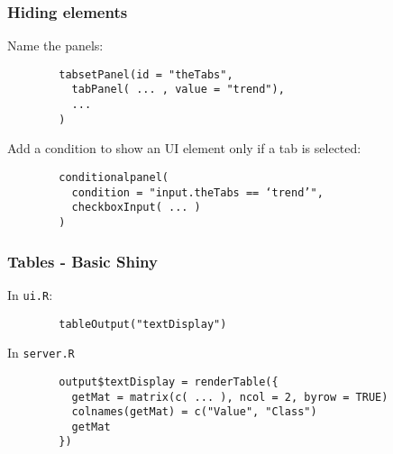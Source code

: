 \documentclass{beamer}
\begin{document}
	\begin{frame}[fragile]
		\frametitle{Hiding elements}
		
		Name the panels:
		\begin{exampleblock}{}
		\begin{BVerbatim}
		tabsetPanel(id = "theTabs",
		  tabPanel( ... , value = "trend"),
		  ...
		)
		\end{BVerbatim}
		\end{exampleblock}{}

		\vspace{1em}

		Add a condition to show an UI element only if a tab is selected:
		\begin{exampleblock}{}
		\begin{BVerbatim}
		conditionalpanel(
		  condition = "input.theTabs == ‘trend’",
		  checkboxInput( ... )
		)
		\end{BVerbatim}
		\end{exampleblock}{}

	\end{frame}

	\begin{frame}[fragile]
		\frametitle{Tables - Basic Shiny}
		
		In \verb|ui.R|:
		\begin{exampleblock}{}
		\begin{BVerbatim}
		tableOutput("textDisplay")
		\end{BVerbatim}
		\end{exampleblock}{}

		\vspace{1em}

		In \verb|server.R|
		\begin{exampleblock}{}
		\begin{BVerbatim}
		output$textDisplay = renderTable({
		  getMat = matrix(c( ... ), ncol = 2, byrow = TRUE)
		  colnames(getMat) = c("Value", "Class")
		  getMat
		})
		\end{BVerbatim}
		\end{exampleblock}{}

	\end{frame}
\end{document}
